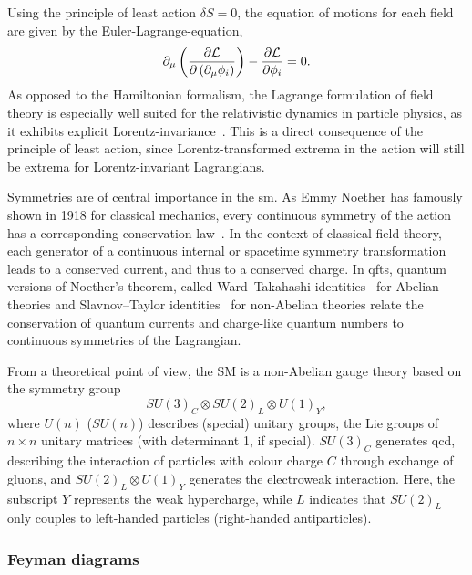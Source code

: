 Using the principle of least action $\delta S = 0$, the equation of motions for each field are given by the Euler-Lagrange-equation,
\begin{equation}
	\partial_\mu\left(\frac{\partial\mathcal{L}}{\partial\left(\partial_\mu\phi_i\right)}\right)-\frac{\partial\mathcal{L}}{\partial\phi_i}=0.
	\label{eq:euler_lagrange}
\end{equation}
As opposed to the Hamiltonian formalism, the Lagrange formulation of field theory is especially well suited for the relativistic dynamics in particle physics, as it exhibits explicit Lorentz-invariance~\cite{Peskin:1995ev}. This is a direct consequence of the principle of least action, since Lorentz-transformed extrema in the action will still be extrema for Lorentz-invariant Lagrangians.

Symmetries are of central importance in the \gls{sm}. As Emmy Noether has famously shown in 1918 for classical mechanics, every continuous symmetry of the action has a corresponding conservation law~\cite{physics/0503066}. In the context of classical field theory, each generator of a continuous internal or spacetime symmetry transformation leads to a conserved current, and thus to a conserved charge. In \glspl{qft}, quantum versions of Noether's theorem, called Ward--Takahashi identities~\cite{PhysRev.78.182,Takahashi1957} for Abelian theories and Slavnov--Taylor identities~\cite{THOOFT1971173,TAYLOR1971436,Slavnov1972} for non-Abelian theories relate the conservation of quantum currents and charge-like quantum numbers to continuous symmetries of the Lagrangian.

From a theoretical point of view, the SM is a non-Abelian gauge theory based on the symmetry group
\begin{equation*}
	SU(3)_C \otimes SU(2)_L \otimes U(1)_Y,
\end{equation*}
where $U(n)$ ($SU(n)$) describes (special) unitary groups, \ie the Lie groups of $n\times n$ unitary matrices (with determinant 1, if special). $SU(3)_C$ generates \gls{qcd}, describing the interaction of particles with colour charge $C$ through exchange of gluons, and $SU(2)_L \otimes U(1)_Y$ generates the electroweak interaction. Here, the subscript $Y$ represents the weak hypercharge, while $L$ indicates that $SU(2)_L$ only couples to left-handed particles (right-handed antiparticles).

\subsubsection{Feyman diagrams}

